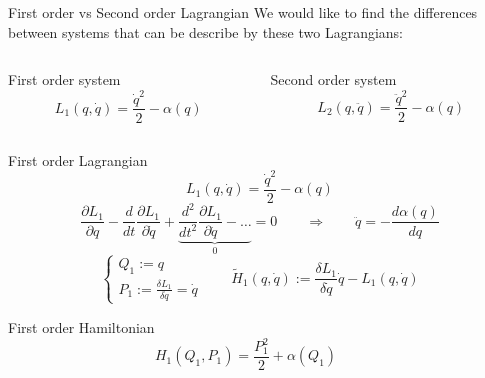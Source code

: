 \begin{frame}{First order vs Second order Lagrangian}
  We would like to find the differences between systems that can be
  describe by these two Lagrangians:
  \vspace{0.5em}
  \begin{columns}
    \begin{column}{0.4\textwidth}
      \begin{center}
        \alert{First order system}
        \begin{equation*}
          L_1(q, \dot{q}) = \frac{\dot{q}^2}{2} - \alpha(q)
        \end{equation*}
      \end{center}
    \end{column}
    \begin{column}{0.4\textwidth}
      \begin{center}
        \alert{Second order system}
        \begin{equation*}
          L_2(q, \ddot{q}) = \frac{\ddot{q}^2}{2} - \alpha(q)
        \end{equation*}
      \end{center}
    \end{column}
  \end{columns}
\end{frame}

\begin{frame}{First order Lagrangian}
  \begin{equation*}
    L_1(q, \dot{q}) = \frac{\dot{q}^2}{2} - \alpha(q)
  \end{equation*}
  \vspace{0.2em}
  \begin{equation*} \label{eq: first-order_motion_eq_lagr}
    \frac{\partial L_1}{\partial q} -
    \frac{d}{dt}\frac{\partial L_1}{\partial \dot{q}} +
    \underbrace{
    \frac{d^2}{dt^2}\frac{\partial L_1}{\partial \ddot{q}} - \ldots }_0 = 0
    \qquad \Rightarrow \qquad
    \ddot{q} = - \frac{d\alpha(q)}{dq}
  \end{equation*}
  \begin{equation*}
    \begin{cases}
      Q_1 := q \\
      P_1 := \frac{\delta L_1}{\delta \dot{q}} = \dot{q}
    \end{cases}
    \qquad
    \tilde{H}_1(q, \dot{q}) :=
    \frac{\delta L_1}{\delta \dot{q}} \dot{q} - L_1(q, \dot{q})
  \end{equation*}
  \begin{block}{First order Hamiltonian}
    \begin{equation*} \label{eq: first-order_motion_eq_ham}
      H_1(Q_1, P_1) = \frac{P_1^2}{2} + \alpha(Q_1) \qquad
    \end{equation*}
  \end{block}
\end{frame}

